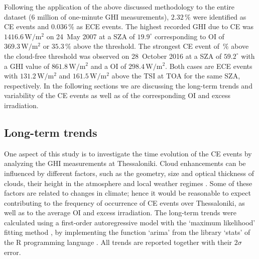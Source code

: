 \documentclass[preprint, 5p,
authoryear]{elsarticle} %
\begin{document}
Following the application of the above discussed methodology to the
entire dataset (\(6\) million of one-minute GHI measurements),
\(2.32\,\%\) were identified as CE events and \(0.036\,\%\) as ECE
events. The highest recorded GHI due to CE was
\(1416.6\,\text{W}/\text{m}^2\) on 24~May 2007 at a SZA of
\(19.9^\circ\) corresponding to OI of \(369.3\,\text{W}/\text{m}^2\) or
\(35.3\,\%\) above the threshold. The strongest CE event of \(\,\%\)
above the cloud-free threshold was observed on 28~October 2016 at a SZA
of \(59.2^\circ\) with a GHI value of \(861.8\,\text{W}/\text{m}^2\) and
a OI of \(298.4\,\text{W}/\text{m}^2\). Both cases are ECE events with
\(131.2\,\text{W}/\text{m}^2\) and \(161.5\,\text{W}/\text{m}^2\) above
the TSI at TOA for the same SZA, respectively. In the following sections
we are discussing the long-term trends and variability of the CE events
as well as of the corresponding OI and excess irradiation.

\hypertarget{long-term-trends}{%
\subsection{Long-term trends}\label{long-term-trends}}

One aspect of this study is to investigate the time evolution of the CE
events by analyzing the GHI measurements at Thessaloniki. Cloud
enhancements can be influenced by different factors, such as the
geometry, size and optical thickness of clouds, their height in the
atmosphere and local weather regimes
\citep{Mol2023, Veerman2022, Gristey2022, Tzoumanikas2016}. Some of
these factors are related to changes in climate; hence it would be
reasonable to expect contributing to the frequency of occurrence of CE
events over Thessaloniki, as well as to the average OI and excess
irradiation. The long-term trends were calculated using a first-order
autoregressive model with the `maximum likelihood' fitting method
\citep{Gardner1980, Jones1980}, by implementing the function `arima'
from the library `stats' of the R programming language \citep{RCT2023}.
All trends are reported together with their \(2\sigma\) error.
\end{document}
